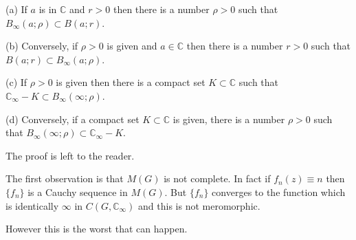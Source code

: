 (a) If $a$ is in $\mathbb{C}$ and $r > 0$ then there is a number $\rho > 0$ such that $B_{\infty}(a; \rho) \subset B(a; r)$.

(b) Conversely, if $\rho > 0$ is given and $a \in \mathbb{C}$ then there is a number $r > 0$ such that $B(a; r) \subset B_{\infty}(a; \rho)$.

(c) If $\rho > 0$ is given then there is a compact set $K \subset \mathbb{C}$ such that $\mathbb{C}_{\infty} - K \subset B_{\infty}(\infty; \rho)$.

(d) Conversely, if a compact set $K \subset \mathbb{C}$ is given, there is a number $\rho > 0$ such that $B_{\infty}(\infty; \rho) \subset \mathbb{C}_{\infty} - K$.

The proof is left to the reader.

The first observation is that $M(G)$ is not complete. In fact if $f_n(z) \equiv n$ then $\{f_n\}$ is a Cauchy sequence in $M(G)$. But $\{f_n\}$ converges to the function which is identically $\infty$ in $C(G, \mathbb{C}_{\infty})$ and this is not meromorphic.

However this is the worst that can happen.